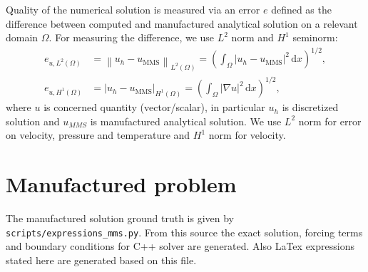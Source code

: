 \documentclass[11pt,a4paper]{article}
\begin{document}
Quality of the numerical solution is measured via an error $e$ defined as the difference between computed and manufactured analytical solution on a relevant domain $\Omega$.
For measuring the difference, we use $L^2$ norm and $H^1$ seminorm:
\begin{subequations}
  \begin{align}
    e_{u, L^2(\Omega)} &= \left\|u_h - u_{\mathrm{MMS}}\right\|_{L^2(\Omega)} =
    \left(
      \int_{\Omega}
      \left|u_h - u_{\mathrm{MMS}}\right|^2
      \,\mathrm{d}x
    \right)^{1/2}, \\
    e_{u,H^1(\Omega)}
      &= \left|u_h-u_{\mathrm{MMS}}\right|_{H^1(\Omega)} =
      \left(
      \int_{\Omega}
      \left|\nabla u\right|^2
      \,\mathrm{d}x
      \right)^{1/2} ,
  \end{align}
\end{subequations}
where $u$ is concerned quantity (vector/scalar), in particular $u_h$ is discretized solution and $u_{MMS}$ is manufactured analytical solution.
We use $L^2$ norm for error on velocity, pressure and temperature and $H^1$ norm for velocity.

\section{Manufactured problem}
The manufactured solution ground truth is given by \texttt{scripts/expressions\_mms.py}.
From this source the exact solution, forcing terms and boundary conditions for C++ solver are generated.
Also LaTex expressions stated here are generated based on this file.
\end{document}
